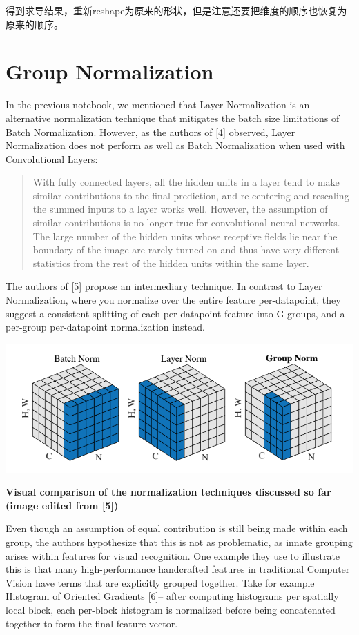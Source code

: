 \documentclass[11pt]{article}
\makeatletter
\def\maxwidth{\ifdim\Gin@nat@width>\linewidth\linewidth
    \else\Gin@nat@width\fi}
\let\Oldincludegraphics\includegraphics
\renewcommand{\includegraphics}[1]{\Oldincludegraphics[width=.8\maxwidth]{#1}}
\makeatother
\begin{document}
得到求导结果，重新reshape为原来的形状，但是注意还要把维度的顺序也恢复为原来的顺序。

    \hypertarget{group-normalization}{%
\section{Group Normalization}\label{group-normalization}}

In the previous notebook, we mentioned that Layer Normalization is an
alternative normalization technique that mitigates the batch size
limitations of Batch Normalization. However, as the authors of {[}4{]}
observed, Layer Normalization does not perform as well as Batch
Normalization when used with Convolutional Layers:

\begin{quote}
With fully connected layers, all the hidden units in a layer tend to
make similar contributions to the final prediction, and re-centering and
rescaling the summed inputs to a layer works well. However, the
assumption of similar contributions is no longer true for convolutional
neural networks. The large number of the hidden units whose receptive
fields lie near the boundary of the image are rarely turned on and thus
have very different statistics from the rest of the hidden units within
the same layer.
\end{quote}

The authors of {[}5{]} propose an intermediary technique. In contrast to
Layer Normalization, where you normalize over the entire feature
per-datapoint, they suggest a consistent splitting of each per-datapoint
feature into G groups, and a per-group per-datapoint normalization
instead.

\includegraphics{normalization.png}

\textbf{Visual comparison of the normalization techniques discussed so
far (image edited from {[}5{]})}

Even though an assumption of equal contribution is still being made
within each group, the authors hypothesize that this is not as
problematic, as innate grouping arises within features for visual
recognition. One example they use to illustrate this is that many
high-performance handcrafted features in traditional Computer Vision
have terms that are explicitly grouped together. Take for example
Histogram of Oriented Gradients {[}6{]}-- after computing histograms per
spatially local block, each per-block histogram is normalized before
being concatenated together to form the final feature vector.
\end{document}

